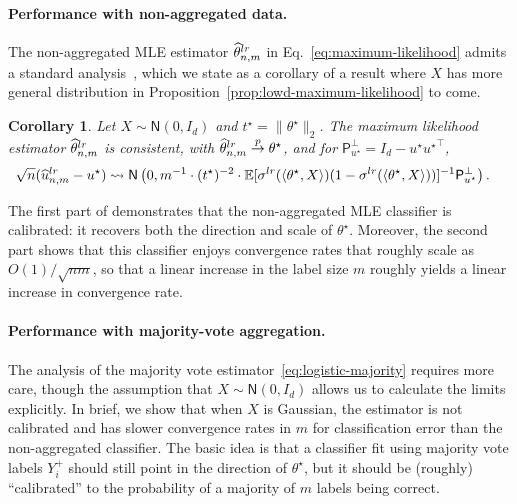 \documentclass[11pt]{article}
\newcommand{\E}{\mathbb{E}}
\newcommand{\Prb}{\mathbb{P}}
\newcommand{\R}{\mathbb{R}} %
\newcommand{\what}[1]{\widehat{#1}}
\newcommand{\majY}{Y^+}
\newcommand{\normal}{\mathsf{N}}
\newcommand{\lr}{^{\textup{lr}}}
\newcommand{\proj}{\mathsf{P}}
\newcommand{\loss}{\ell}
\newcommand{\norms}[1]{\|{#1}\|} %
\newcommand{\ltwos}[1]{\norms{#1}_2} %
\newcommand{\<}{\langle} %
\renewcommand{\>}{\rangle}
\newcommand{\cd}{\rightsquigarrow}
\newcommand{\cp}{\stackrel{p}{\rightarrow}}
\newcommand{\opt}{^\star}
\newcommand{\tmle}{\what{\theta}\lr_{n,m}} %
\newtheorem{corollary}{Corollary}
\begin{document}
\paragraph{Performance with non-aggregated data.}

The
non-aggregated MLE estimator $\tmle$ in Eq.~\eqref{eq:maximum-likelihood}
admits a standard analysis~\cite{VanDerVaart98},
which we state as a corollary of a result where $X$ has more general
distribution in Proposition~\ref{prop:lowd-maximum-likelihood} to come.
%
\begin{corollary}
  \label{cor:lowd-maximum-likelihood-Gaussian} 
  Let $X \sim \normal(0, I_d)$ and $t\opt = \ltwos{\theta\opt}$. The maximum
  likelihood estimator $\tmle$ is consistent, with $\tmle \cp
  \theta\opt$, and for $\proj_{u\opt}^\perp = I_d - u\opt {u\opt}^\top$,
  \begin{align*}
    \sqrt{n} (\what{u}\lr_{n,m} - u^\star)
    & \cd \normal\left(0,  m^{-1}
    \cdot (t\opt)^{-2} \cdot \E[\sigma\lr(\<\theta\opt, X\>)
      (1 - \sigma\lr(\<\theta\opt, X\>))]^{-1}
    \proj_{u\opt}^\perp \right).
  \end{align*}
\end{corollary}

The first part of  demonstrates
that the non-aggregated MLE classifier is calibrated: it recovers both the
direction and scale of $\theta\opt$. Moreover, the second part shows that
this classifier enjoys convergence rates that roughly scale as
$O(1)/\sqrt{nm}$, so that a linear increase in the label size $m$ roughly
yields a linear increase in convergence rate.


\paragraph{Performance with majority-vote aggregation.}

The analysis of the majority vote estimator~\eqref{eq:logistic-majority}
requires more care, though the assumption that $X \sim \normal(0, I_d)$ allows
us to calculate the limits explicitly. In
brief, we show that when $X$ is Gaussian, the estimator is not calibrated
and has slower convergence rates in $m$ for classification error than the
non-aggregated classifier.
The basic idea is that a classifier fit using
majority vote labels $\majY_i$
should still point in the direction of $\theta\opt$,
but it should be (roughly) ``calibrated'' to the probability of a majority
of $m$ labels being correct.
\end{document}
